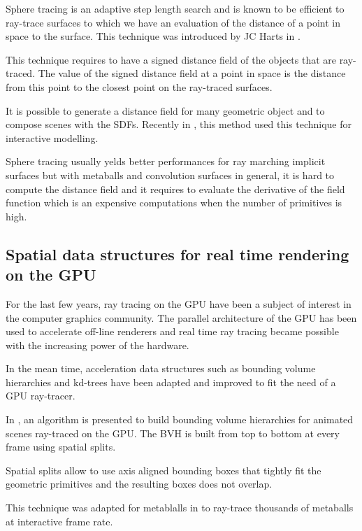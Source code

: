 \documentclass[annual]{acmsiggraph}
\begin{document}
Sphere tracing is an adaptive step length search and is known to be efficient to ray-trace surfaces to which we have an evaluation of the distance of a point in space to the surface.
This technique was introduced by JC Harts in \cite{springerlink:10.1007/s003710050084}.

This technique requires to have a signed distance field of the objects that are ray-traced.
The value of the signed distance field at a point in space is the distance from this point to the closest point on the ray-traced surfaces.

It is possible to generate a distance field for many geometric object and to compose scenes with the SDFs.
Recently in \cite{Reiner2011596}, this method used this technique for interactive modelling.

Sphere tracing usually yelds better performances for ray marching implicit surfaces but with metaballs and convolution surfaces in general, it is hard to compute the distance field and it requires to evaluate the derivative of the field function which is an expensive computations when the number of primitives is high.



\subsection{Spatial data structures for real time rendering on the GPU}

For the last few years, ray tracing on the GPU have been a subject of interest in the computer graphics community. The parallel architecture of the GPU has been used to accelerate off-line renderers and real time ray tracing became possible with the increasing power of the hardware.

In the mean time, acceleration data structures such as bounding volume hierarchies and kd-trees have been adapted and improved to fit the need of a GPU ray-tracer. 

In \cite{Stich2009hpg}, an algorithm is presented to build bounding volume hierarchies for animated scenes ray-traced on the GPU.
The BVH is built from top to bottom at every frame using spatial splits.

Spatial splits allow to use axis aligned bounding boxes that tightly fit the geometric primitives and the resulting boxes does not overlap.


This technique was adapted for metablalls in \cite{Gourmel-2010-FBVH} to ray-trace thousands of metaballs at interactive frame rate.
\end{document}
